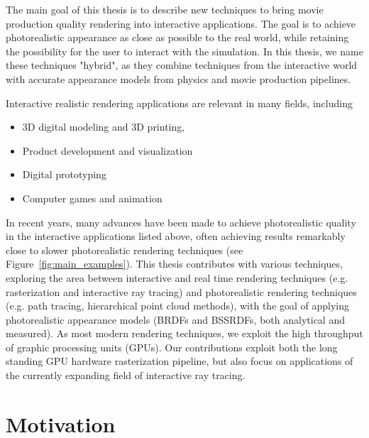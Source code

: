The main goal of this thesis is to describe new techniques to bring movie production quality rendering into interactive applications.  The goal is to achieve photorealistic appearance as close as possible to the real world, while retaining the possibility for the user to interact with the simulation. In this thesis, we name these techniques "hybrid", as they combine techniques from the interactive world with accurate appearance models from physics and movie production pipelines.

Interactive realistic rendering applications are relevant in many fields, including
\begin{itemize}
\item 3D digital modeling and 3D printing,
\item Product development and visualization
\item Digital prototyping
\item Computer games and animation
\end{itemize}
In recent years, many advances have been made to achieve photorealistic quality in the interactive applications listed above, often achieving results remarkably close to slower photorealistic rendering techniques (see Figure~\ref{fig:main_examples}). This thesis contributes with various techniques, exploring the area between interactive and real time rendering techniques (e.g. rasterization and interactive ray tracing) and photorealistic rendering techniques (e.g. path tracing, hierarchical point cloud methods), with the goal of applying photorealistic appearance models (BRDFs and BSSRDFs, both analytical and measured). As most modern rendering techniques, we exploit the high throughput of graphic processing units (GPUs). Our contributions exploit both the long standing GPU hardware rasterization pipeline, but also focus on applications of the currently expanding field of interactive ray tracing. 

\section{Motivation}

